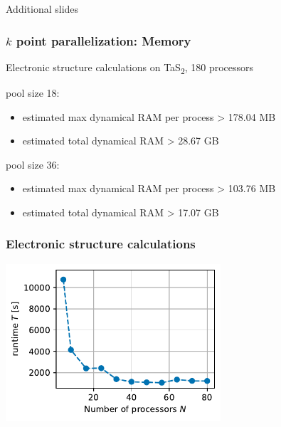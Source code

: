 \documentclass[aspectratio=169]{beamer}
\newcommand{\TaS}{TaS\textsubscript{2}\xspace}
\begin{document}

\begin{frame}
	\centering
	{\huge Additional slides}
\end{frame}


\begin{frame}
	\frametitle{\(k\) point parallelization: Memory}

	Electronic structure calculations on \TaS, 180 processors

	\vspace{10pt}

	pool size 18:
	\begin{itemize}
		\item estimated max dynamical RAM per process > 178.04 MB
		\item estimated total dynamical RAM > 28.67 GB
	\end{itemize}

	pool size 36:
	\begin{itemize}
		\item estimated max dynamical RAM per process > 103.76 MB
		\item estimated total dynamical RAM > 17.07 GB
	\end{itemize}
\end{frame}

\begin{frame}
	\frametitle{Electronic structure calculations}

	\centering
	\includegraphics[width=0.6\textwidth]{figs/TaS2_intel_bench_nprocs_absolute.pdf}

\end{frame}

\end{document}
